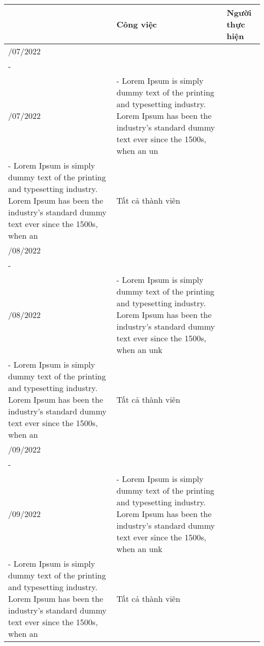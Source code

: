 \begin{tabularx}{\textwidth}{|>{\centering\let\newline
    \\\arraybackslash}X|>{\raggedright\let\newline
    \\\arraybackslash}X|>{\centering\let\newline
    \\\arraybackslash}X|}
    \hline
    \textbf{Thời gian}
     & \textbf{Công việc}
     & \textbf{Người thực hiện}
    \\
    \hline
    19/07/2022
    \newline
    -
    \newline
    31/07/2022
     & - Lorem Ipsum is simply dummy text of the printing and typesetting industry. Lorem
    Ipsum has been the industry's standard dummy text ever since the 1500s, when an un
    \newline
    - Lorem Ipsum is simply dummy text of the printing and typesetting industry. Lorem
    Ipsum has been the industry's standard dummy text ever since the 1500s, when an
     & Tất cả thành viên
    \\
    \hline
    01/08/2022
    \newline
    -
    \newline
    31/08/2022
     & - Lorem Ipsum is simply dummy text of the printing and typesetting industry. Lorem
    Ipsum has been the industry's standard dummy text ever since the 1500s, when an unk
    \newline
    - Lorem Ipsum is simply dummy text of the printing and typesetting industry. Lorem
    Ipsum has been the industry's standard dummy text ever since the 1500s, when an
     & Tất cả thành viên
    \\
    \hline
    01/09/2022
    \newline
    -
    \newline
    30/09/2022
     & - Lorem Ipsum is simply dummy text of the printing and typesetting industry. Lorem
    Ipsum has been the industry's standard dummy text ever since the 1500s, when an unk
    \newline
    - Lorem Ipsum is simply dummy text of the printing and typesetting industry. Lorem
    Ipsum has been the industry's standard dummy text ever since the 1500s, when an
     & Tất cả thành viên
    \\
    \hline
\end{tabularx}